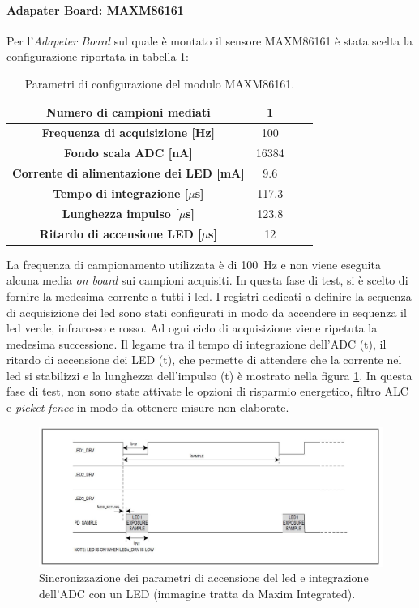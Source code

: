 \paragraph{Adapater Board: MAXM86161}
Per l'\textit{Adapeter Board} sul quale è montato il sensore MAXM86161 è stata scelta la configurazione riportata in tabella \ref{tab:ConfigMAXM86161}:
\begin{table}[h]
	\renewcommand{\arraystretch}{1.5}
	\centering
	\footnotesize
	\begin{tabular}{cccc}
		\textbf{Numero di campioni mediati} & 1 \\ \hline
		\textbf{Frequenza di acquisizione [Hz]} & 100 \\ \hline
		\textbf{Fondo scala ADC [nA]} & 16384 \\ \hline
		\textbf{Corrente di alimentazione dei LED [mA]} & 9.6 \\ \hline
		\textbf{Tempo di integrazione [$\mu$s]} & 117.3 \\ \hline
		\textbf{Lunghezza impulso [$\mu$s]} & 123.8 \\ \hline
		\textbf{Ritardo di accensione LED [$\mu$s]} & 12 \\ \hline
	\end{tabular}
	\caption{Parametri di configurazione del modulo MAXM86161.}
	\label{tab:ConfigMAXM86161}
\end{table}
La frequenza di campionamento utilizzata è di \SI{100}{\hertz} e non viene eseguita alcuna media \textit{on board} sui campioni acquisiti. In questa fase di test, si è scelto di fornire la medesima corrente a tutti i led. I registri dedicati a definire la sequenza di acquisizione dei led sono stati configurati in modo da accendere in sequenza il led verde, infrarosso e rosso. Ad ogni ciclo di acquisizione viene ripetuta la medesima successione. Il legame tra il tempo di integrazione dell'ADC (t), il ritardo di accensione dei LED (t), che permette di attendere che la corrente nel led si stabilizzi e la lunghezza dell'impulso (t) è mostrato nella figura \ref{fig:tempi_maxm}. In questa fase di test, non sono state attivate le opzioni di risparmio energetico, filtro ALC e \textit{picket fence} in modo da ottenere misure non elaborate.

\begin{figure}[h]
	\centering
	\includegraphics[width=1\linewidth]{ImageFiles/Misure Preliminari/tpower_maxm}
	\caption{Sincronizzazione dei parametri di accensione del led e integrazione dell'ADC con un LED (immagine tratta da Maxim Integrated\cite{IntegratedMAXM86161}).}
	\label{fig:tempi_maxm}
\end{figure}

